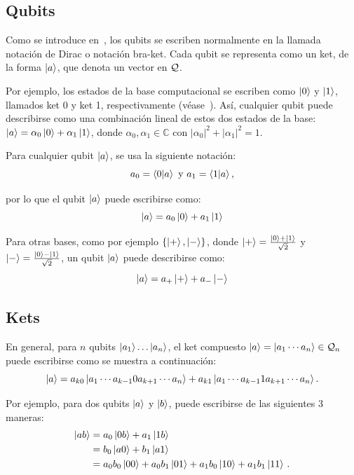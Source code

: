 \subsection{Qubits}
Como se introduce en~\cite{diracBraket}, los qubits se escriben normalmente en la llamada notación de Dirac o notación bra-ket.
Cada qubit se representa como un ket, de la forma $\ket{a}$, que denota un vector en $\mathcal{Q}$.

Por ejemplo, los estados de la base computacional se escriben como $\ket{0}$ y $\ket{1}$, llamados ket 0 y ket 1, respectivamente (véase~\cite{NielsenChuang}).
Así, cualquier qubit puede describirse como una combinación lineal de estos dos estados de la base: $\ket{a} =\alpha_0\ket{0} +\alpha_1 \ket{1}$, donde $\alpha_0,  \alpha_1 \in \mathbb{C}$ con $ |\alpha_0|^{2}+|\alpha_1|^{2}=1$.

\begin{notation}
  Para cualquier qubit $\ket{a}$, se usa la siguiente notación:
  \[a_{0}=\braket{0}{a}\text{ y }a_{1}=\braket{1}{a},\]
\end{notation}
por lo que el qubit $\ket{a}$ puede escribirse como:
\begin{equation}
  \label{eq:qubit-coordenadas}
  \ket{a}=a_0\ket{0}+a_1\ket{1}
\end{equation}

Para otras bases, como por ejemplo $\{\ket{+}, \ket{-}\}$, donde $\ket{+}=\frac{\ket{0}+\ket{1}}{\sqrt{2}}$ y $\ket{-}=\frac{\ket{0}-\ket{1}}{\sqrt{2}}$, un qubit $\ket{a}$ puede describirse como:
\begin{equation}
  \label{eq:qubit-coordenadas-h}
  \ket{a}=a_+\ket{+}+a_-\ket{-}
\end{equation}

\subsection{Kets}

En general, para $n$ qubits $\ket{a_1}\dots\ket{a_n}$, el ket compuesto $\ket{a}=\ket{a_1\cdots a_n}\in\mathcal{Q}_n$ puede escribirse como se muestra a continuación:
\begin{equation}
  \label{eq:nqubit-coordenadas}
  \ket{a}=a_{k0}\ket{a_1\cdots a_{k-1}0a_{k+1}\cdots a_n}+a_{k1}\ket{a_1\cdots a_{k-1}1a_{k+1}\cdots a_n}.
\end{equation}

Por ejemplo, para dos qubits $\ket{a}$ y $\ket{b}$, puede escribirse de las siguientes 3 maneras:
\begin{align*}
  \ket{ab} & =a_0\ket{0b}+a_1\ket{1b}                                            \\
           & =b_0\ket{a0}+b_1\ket{a1}                                            \\
           & =a_0 b_0\ket{00}+a_0 b_1\ket{01}+a_1 b_0\ket{10}+a_1 b_1\ket{11}\,.
\end{align*}

